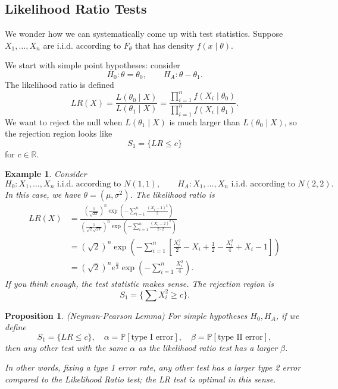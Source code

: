 \documentclass{tufte-handout}
\newcommand*\R{\mathbb{R}}
\renewcommand{\P}{\mathbb{P}}
\newtheorem{ex}[thm]{Example}
\newtheorem{prop}[thm]{Proposition}
\theoremstyle{definition}
\begin{document}
\subsection{Likelihood Ratio Tests}
We wonder how we can systematically come up with test statistics. Suppose $X_1,\ldots,X_n$ are i.i.d. according to $F_\theta$ that has density $f(x\mid \theta)$. 

We start with simple point hypotheses: consider \[
	H_0: \theta = \theta_0, \qquad H_A: \theta - \theta_1
.\] The likelihood ratio is defined \[
	LR(X) = \frac{L(\theta_0 \mid X)}{L(\theta_1 \mid X)} = \frac{\prod_{i=1}^{n} f(X_i \mid \theta_0) }{\prod_{i=1}^{n} f(X_i \mid \theta_1) }
.\] We want to reject the null when $L(\theta_1 \mid X)$ is much larger than $L(\theta_0 \mid X)$, so the rejection region looks like \[
	S_1 = \{LR \le c\}
\] for $c \in \R$.

\begin{ex}
	Consider \[
		H_0: X_1,\ldots,X_n \text{ i.i.d. according to } N(1,1), \qquad H_A: X_1,\ldots,X_n \text{ i.i.d. according to } N(2,2)
	.\] 
	In this case, we have $\theta = (\mu,\sigma^2)$.
	The likelihood ratio is 
	\begin{align*}
		LR(X) &= \frac{\left( \frac{1}{\sqrt{2\pi} } \right)^{n} \exp{\left(-\sum\limits_{i=1}^{n} \frac{\left( X_i -1 \right)^2}{2}\right)}}{\left( \frac{1}{\sqrt{2} \sqrt{2\pi} } \right)^{n} \exp{\left(-\sum\limits_{i=1}^{n} \frac{\left( X_i - 2 \right)^2}{2\cdot 2}\right)}} \\
		&= \left( \sqrt{2}  \right)^{n} \exp{\left(-\sum\limits_{i=1}^{n} \left[ \frac{X_i^2}{2}-X_i + \frac{1}{2} - \frac{X_i^2}{4} + X_i - 1 \right]\right)} \\
		&= \left( \sqrt{2}  \right)^{n} e^{\frac{n}{2}} \exp\left(- \sum\limits_{i=1}^{n} \frac{X_i^2}{4} \right)
	.\end{align*}
	If you think enough, the test statistic makes sense.
	The rejection region is \[
		S_1 = \{\sum X_i^2 \ge c\}
	.\] 
\end{ex}

\begin{prop}
	(Neyman-Pearson Lemma) For simple hypotheses $H_0,H_A$, if we define \[
		S_1 = \{LR \le c\}, \quad \alpha = \P\left[\text{type I error}\right], \quad \beta = \P\left[\text{type II error}\right] 
	,\]  then any other test with the same $\alpha$ as the likelihood ratio test has a larger $\beta$.

	In other words, fixing a type 1 error rate, any other test has a larger type 2 error compared to the Likelihood Ratio test; the LR test is optimal in this sense.
\end{prop}
\end{document}

